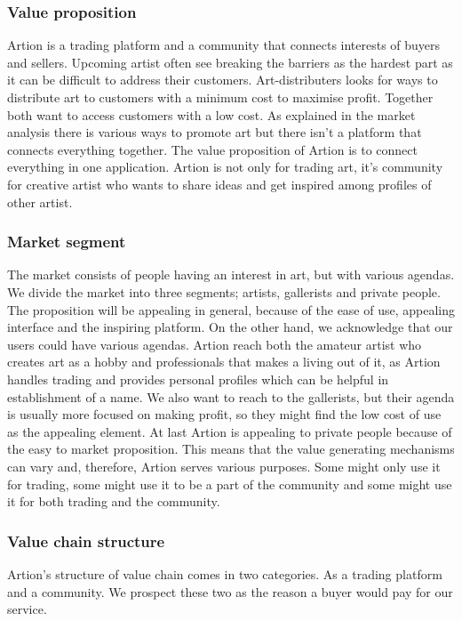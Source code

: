 \subsubsection{Value proposition}
Artion is a trading platform and a community that connects interests of buyers and sellers. Upcoming artist often see breaking the barriers as the hardest part as it can be difficult to address their customers. Art-distributers looks for ways to distribute art to customers with a minimum cost to maximise profit. Together both want to access customers with a low cost. As explained in the market analysis there is various ways to promote art but there isn’t a platform that connects everything together. The value proposition of Artion is to connect everything in one application. Artion is not only for trading art, it’s community for creative artist who wants to share ideas and get inspired among profiles of other artist.

\subsubsection{Market segment}
The market consists of people having an interest in art, but with various agendas. We divide the market into three segments; artists, gallerists and private people. The proposition will be appealing in general, because of the ease of use, appealing interface and the inspiring platform. On the other hand, we acknowledge that our users could have various agendas. 
Artion reach both the amateur artist who creates art as a hobby and professionals that makes a living out of it, as Artion handles trading and provides personal profiles which can be helpful in establishment of a name. We also want to reach to the gallerists, but their agenda is usually more focused on making profit, so they might find the low cost of use as the appealing element. At last Artion is appealing to private people because of the easy to market proposition.
This means that the value generating mechanisms can vary and, therefore, Artion serves various purposes. Some might only use it for trading, some might use it to be a part of the community and some might use it for both trading and the community.


\subsubsection{Value chain structure }
Artion’s structure of value chain comes in two categories. As a trading platform and a community. We prospect these two as the reason a buyer would pay for our service.

